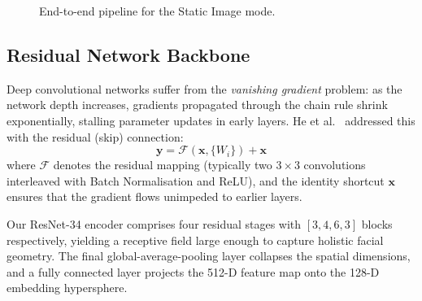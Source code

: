 \documentclass[conference, 10pt]{IEEEtran}
\begin{document}
\begin{figure}[htbp]
\centering
{}
\caption{End-to-end pipeline for the Static Image mode.}
\label{fig:pipeline}
\end{figure}

\subsection{Residual Network Backbone}

Deep convolutional networks suffer from the \emph{vanishing gradient} problem: as the network
depth increases, gradients propagated through the chain rule shrink exponentially, stalling
parameter updates in early layers.  He et al.~\cite{ref_resnet} addressed this with the
residual (skip) connection:
\begin{equation}
\label{eq:residual}
    \mathbf{y} = \mathcal{F}(\mathbf{x}, \{W_i\}) + \mathbf{x}
\end{equation}
where $\mathcal{F}$ denotes the residual mapping (typically two $3\times3$ convolutions
interleaved with Batch Normalisation and ReLU), and the identity shortcut $\mathbf{x}$ ensures
that the gradient flows unimpeded to earlier layers.

Our ResNet-34 encoder comprises four residual stages with $[3, 4, 6, 3]$ blocks respectively,
yielding a receptive field large enough to capture holistic facial geometry.  The final
global-average-pooling layer collapses the spatial dimensions, and a fully connected layer
projects the 512-D feature map onto the 128-D embedding hypersphere.
\end{document}
